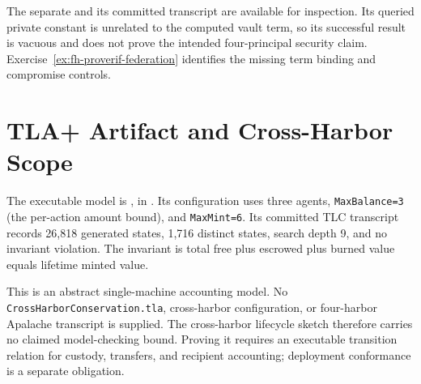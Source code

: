 \documentclass[11pt,a4paper]{article}
\theoremstyle{definition}
\theoremstyle{remark}
\begin{document}
The separate  and its committed transcript are available for inspection. Its queried private constant is unrelated to the computed vault term, so its successful result is vacuous and does not prove the intended four-principal security claim. Exercise~\ref{ex:fh-proverif-federation} identifies the missing term binding and compromise controls.

\section{TLA+ Artifact and Cross-Harbor Scope}\label{app:fh-tla}

The executable model is , in . Its  configuration uses three agents, \texttt{MaxBalance=3} (the per-action amount bound), and \texttt{MaxMint=6}. Its committed TLC transcript records 26,818 generated states, 1,716 distinct states, search depth 9, and no invariant violation. The invariant is total free plus escrowed plus burned value equals lifetime minted value.

This is an abstract single-machine accounting model. No \texttt{CrossHarborConservation.tla}, cross-harbor configuration, or four-harbor Apalache transcript is supplied. The cross-harbor lifecycle sketch therefore carries no claimed model-checking bound. Proving it requires an executable transition relation for custody, transfers, and recipient accounting; deployment conformance is a separate obligation.
\end{document}
